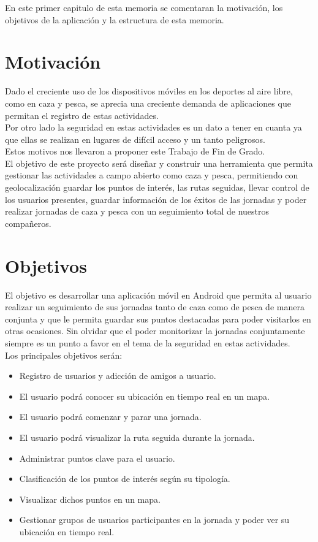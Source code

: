 En este primer capitulo de esta memoria se comentaran la motivación, los objetivos de la aplicación y la estructura de esta memoria. 




\section{Motivación}
Dado el creciente uso de los dispositivos móviles en los deportes al aire libre, como en caza y pesca, se aprecia una creciente demanda de aplicaciones que permitan el registro de estas actividades.\\
Por otro lado la seguridad en estas actividades es un dato a tener en cuanta ya que ellas se realizan en lugares de difícil acceso y un tanto peligrosos.\\

Estos motivos nos llevaron a proponer este Trabajo de Fin de Grado.\\

El objetivo de este proyecto será diseñar y construir una herramienta que permita gestionar las actividades a campo abierto como
caza y pesca, permitiendo con geolocalización guardar los puntos de interés, las rutas seguidas,
llevar control de los usuarios presentes, guardar información de los éxitos de las jornadas y poder realizar jornadas de caza y pesca con un seguimiento  total de nuestros compañeros.






 

\section{Objetivos}
El objetivo es desarrollar una aplicación móvil en Android que permita al usuario realizar un seguimiento de sus jornadas tanto de caza como de pesca de manera conjunta y que le permita guardar sus puntos destacadas para poder visitarlos en otras ocasiones. Sin olvidar que el poder monitorizar la jornadas conjuntamente siempre es un punto a favor en el tema de la seguridad en estas actividades.\\ Los principales objetivos serán:

\begin{itemize}
\item Registro de usuarios y adicción de amigos a usuario.
\item El usuario podrá conocer su ubicación en tiempo real en un mapa.
\item El usuario podrá comenzar y parar una jornada.
\item El usuario podrá visualizar la ruta seguida durante la jornada.
\item Administrar puntos clave para el usuario.
\item Clasificación de los puntos de interés según su tipología.
\item Visualizar dichos puntos en un mapa.
\item Gestionar grupos de usuarios participantes en la jornada y poder ver su ubicación en tiempo
real.

\end{itemize}


